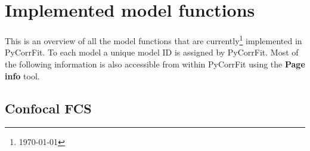 \section{Implemented model functions}
\label{sec:imple}
This is an overview of all the model functions that are currently\footnote{\today} implemented in PyCorrFit. To each model a unique model ID is assigned by PyCorrFit. Most of the following information is also accessible from within PyCorrFit using the \textbf{Page info} tool.

\subsection{Confocal FCS}
\label{sec:imple.confoc}






